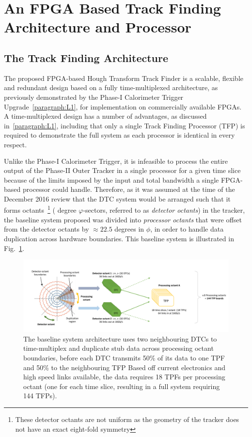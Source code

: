\section{An FPGA Based Track Finding Architecture and Processor}\label{sec:TMTT}
\subsection{The Track Finding Architecture}\label{subsec:TFA}
The proposed FPGA-based Hough Transform Track Finder is a scalable, flexible and redundant design based on a fully time-multiplexed architecture, as previously demonstrated by the Phase-I Calorimeter Trigger Upgrade~\ref{paragraph:L1}, for implementation on commercially available FPGAs.
A time-multiplexed design has a number of advantages, as discussed in~\ref{paragraph:L1}, including that only a single Track Finding Processor (TFP) is required to demonstrate the full system as each processor is identical in every respect.

Unlike the Phase-I Calorimeter Trigger, it is infeasible to process the entire output of the Phase-II Outer Tracker in a single processor for a given time slice because of the limits imposed by the input and total bandwidth a single FPGA-based processor could handle.
Therefore, as it was assumed at the time of the December 2016 review that the DTC system would be arranged such that it forms octants~\footnote{These detector octants are not uniform as the geometry of the tracker does not have an exact eight-fold symmetry} ( degree $\varphi$-sectors, referred to as \emph {detector octants}) in the tracker, the baseline system proposed was divided into \emph{processor octants} that were offset from the detector octants by $\approx 22.5$ degrees in $\phi$, in order to handle data duplication across hardware boundaries.
This baseline system is illustrated in Fig.~\ref{fig:tmttarch}.

\begin{figure}[t]
\centering
\includegraphics[width=1.00\textwidth]{figs/tk-upgrade/tmttarch.pdf}
\caption{The baseline system architecture uses two neighbouring DTCs to time-multiplex and duplicate stub data across processing octant boundaries, before each DTC transmits 50\% of its data to one TPF and 50\% to the neighbouring TFP Based off current electronics and high speed links available, the data requires 18 TPFs per processing octant (one for each time slice, resulting in a full system requiring 144 TFPs).}
\label{fig:tmttarch}
\end{figure}

